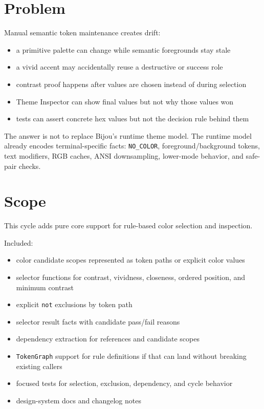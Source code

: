 \section{Problem}\label{record-184-problem}

Manual semantic token maintenance creates drift:

\begin{itemize}
\tightlist
\item
  a primitive palette can change while semantic foregrounds stay stale
\item
  a vivid accent may accidentally reuse a destructive or success role
\item
  contrast proof happens after values are chosen instead of during selection
\item
  Theme Inspector can show final values but not why those values won
\item
  tests can assert concrete hex values but not the decision rule behind them
\end{itemize}

The answer is not to replace Bijou's runtime theme model. The runtime model already encodes terminal-specific facts: \texttt{N\allowbreak{}O\allowbreak{}\_\allowbreak{}C\allowbreak{}O\allowbreak{}L\allowbreak{}O\allowbreak{}R}, foreground/background tokens, text modifiers, RGB caches, ANSI downsampling, lower-mode behavior, and safe-pair checks.

\section{Scope}\label{record-184-scope}

This cycle adds pure core support for rule-based color selection and inspection.

Included:

\begin{itemize}
\tightlist
\item
  color candidate scopes represented as token paths or explicit color values
\item
  selector functions for contrast, vividness, closeness, ordered position, and minimum contrast
\item
  explicit \texttt{n\allowbreak{}o\allowbreak{}t} exclusions by token path
\item
  selector result facts with candidate pass/fail reasons
\item
  dependency extraction for references and candidate scopes
\item
  \texttt{T\allowbreak{}o\allowbreak{}k\allowbreak{}e\allowbreak{}n\allowbreak{}G\allowbreak{}r\allowbreak{}a\allowbreak{}p\allowbreak{}h} support for rule definitions if that can land without breaking existing callers
\item
  focused tests for selection, exclusion, dependency, and cycle behavior
\item
  design-system docs and changelog notes
\end{itemize}

